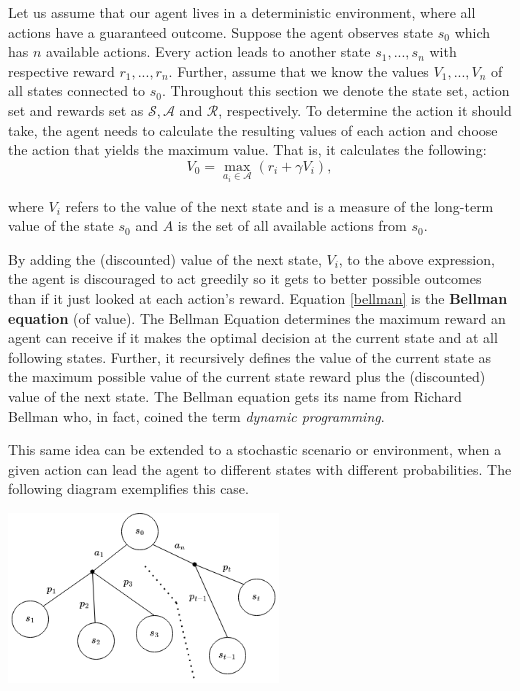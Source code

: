 \documentclass[11pt]{article}
\theoremstyle{definition}
\begin{document}
Let us assume that our agent lives in a deterministic environment, where all actions have a guaranteed outcome. Suppose the agent observes state $s_0$ which has $n$ available actions. Every action leads to another state $s_1, ..., s_n$ with respective reward $r_1, ..., r_n$. Further, assume that we know the values $V_1, ..., V_n$ of all states connected to $s_0$. Throughout this section we denote the state set, action set and rewards set as $\mathcal{S}, \mathcal{A}$ and $\mathcal{R}$, respectively. To determine the action it should take, the agent needs to calculate the resulting values of each action and choose the action that yields the maximum value. That is, it calculates the following:
\begin{equation} \label{bellman}
    V_0 = \max_{a_i \in \mathcal{A}}(r_i + \gamma V_i),
\end{equation}

where $V_i$ refers to the value of the next state and is a measure of the long-term value of the state $s_0$ and $A$ is the set of all available actions from $s_0$.

By adding the (discounted) value of the next state, $V_i$, to the above expression, the agent is discouraged to act greedily so it gets to better possible outcomes than if it just looked at each action's reward. Equation \ref{bellman} is the \textbf{Bellman equation} (of value). The Bellman Equation determines the maximum reward an agent can receive if it makes the optimal decision at the current state and at all following states. Further, it recursively defines the value of the current state as the maximum possible value of the current state reward plus the (discounted) value of the next state. The Bellman equation gets its name from Richard Bellman who, in fact, coined the term \textit{dynamic programming}.

This same idea can be extended to a stochastic scenario or environment, when a given action can lead the agent to different states with different probabilities. The following diagram exemplifies this case.

\begin{center}
    \centering
    \includegraphics[width=\textwidth, height=4.5cm, keepaspectratio=true]{images/stochastic_env.png}
    \label{fig:stoch_env}
\end{center}
\end{document}

